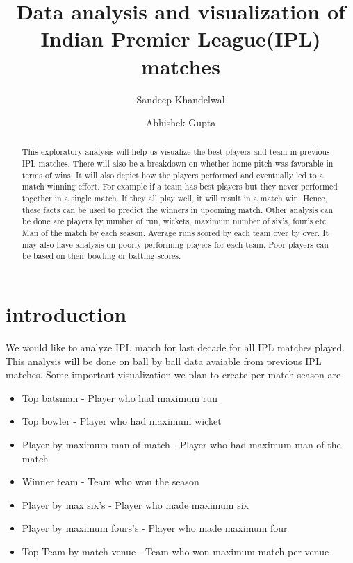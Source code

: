 \documentclass[sigconf]{acmart}
\begin{document}
\title{Data analysis and visualization of Indian Premier League(IPL) matches}

\author{Sandeep Khandelwal}

\author{Abhishek Gupta}

\begin{abstract}

This exploratory analysis will help us visualize the best players and team in previous
IPL matches. There will also be a breakdown on whether
home pitch was favorable in terms of wins. It will also depict how the players 
performed and eventually led to a match winning effort. For example if 
a team has best players but they never performed together in a single match.
If they all play well, it will result in a match win. Hence, these facts can be used to
predict the winners in upcoming match. Other analysis can be done are players by
number of run, wickets, maximum number of six's, four's etc. Man of the match
by each season. Average runs scored by each team over by over. It may also
have analysis on poorly performing players for each team. Poor players 
can be based on their bowling or batting scores. 
   
\end{abstract}


\maketitle

\section{introduction}
We would like to analyze IPL match for last decade for all IPL matches played. This analysis
will be done on ball by ball data avaiable from previous IPL matches. Some important visualization
we plan to create per match season are
\begin {itemize}
\item Top batsman - Player who had maximum run
\item Top bowler - Player who had maximum wicket
\item Player by maximum man of match - Player who had maximum man of the match
\item Winner team - Team who won the season
\item Player by max six's - Player who made maximum six
\item Player by maximum fours's - Player who made maximum four
\item Top Team by match venue - Team who won maximum match per venue
\end {itemize}
\end{document}
